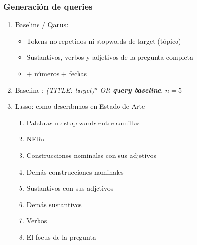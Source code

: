 \begin{frame}
\frametitle{Generación de queries}
  \begin{enumerate}
    \item Baseline / Qanus: 
    \begin{itemize}
      \item Tokens no repetidos ni stopwords de target (tópico)
      \item Sustantivos, verbos y adjetivos de la pregunta completa
      \item {\color{blue} + números + fechas}
    \end{itemize}
    \item Baseline : \textit{(TITLE: target)$^n$ OR \textbf{query baseline}},  $n=5$
    \item Lasso: como describimos en Estado de Arte
      \begin{enumerate}
        \item Palabras no stop words entre comillas
        \item NERs
        \item Construcciones nominales con sus adjetivos
        \item Demás construcciones nominales
        \item Sustantivos con sus adjetivos
        \item Demás sustantivos
        \item Verbos
        \item \st{El focus de la pregunta}
        \end{enumerate}
  \end{enumerate}


\end{frame}

